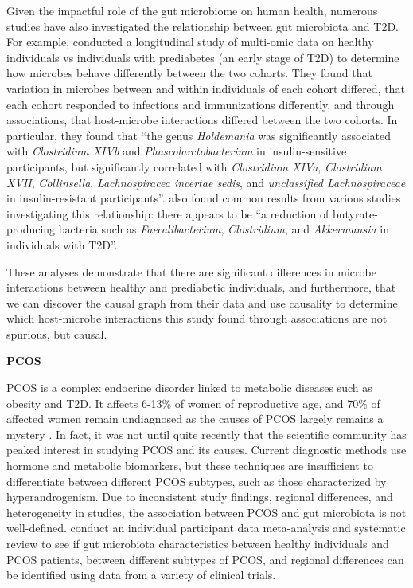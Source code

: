 \documentclass[12pt,letterpaper]{article}
\begin{document}
Given the impactful role of the gut microbiome on human health, numerous studies have also investigated the relationship between gut microbiota and T2D. For example, \citep{zhou2019t2d} conducted a longitudinal study of multi-omic data on healthy individuals vs individuals with prediabetes (an early stage of T2D) to determine how microbes behave differently between the two cohorts. They found that variation in microbes between and within individuals of each cohort differed, that each cohort responded to infections and immunizations differently, and through associations, that host-microbe interactions differed between the two cohorts. In particular, they found that “the genus \textit{Holdemania} was significantly associated with \textit{Clostridium XIVb} and \textit{Phascolarctobacterium} in insulin-sensitive participants, but significantly correlated with \textit{Clostridium XIVa}, \textit{Clostridium XVII}, \textit{Collinsella}, \textit{Lachnospiracea incertae sedis}, and \textit{unclassified Lachnospiraceae} in insulin-resistant participants”. \citep{baars2024gutt2d} also found common results from various studies investigating this relationship: there appears to be “a reduction of butyrate-producing bacteria such as \textit{Faecalibacterium}, \textit{Clostridium}, and \textit{Akkermansia} in individuals with T2D”. 

These analyses demonstrate that there are significant differences in microbe interactions between healthy and prediabetic individuals, and furthermore, that we can discover the causal graph from their data and use causality to determine which host-microbe interactions this study found through associations are not spurious, but causal. \newline

\textbf{PCOS}

PCOS is a complex endocrine disorder linked to metabolic diseases such as obesity and T2D. It affects 6-13\% of women of reproductive age, and 70\% of affected women remain undiagnosed as the causes of PCOS largely remains a mystery \citep{who2025pcos}. In fact, it was not until quite recently that the scientific community has peaked interest in studying PCOS and its causes. Current diagnostic methods use hormone and metabolic biomarkers, but these techniques are insufficient to differentiate between different PCOS subtypes, such as those characterized by hyperandrogenism. Due to inconsistent study findings, regional differences, and heterogeneity in studies, the association between PCOS and gut microbiota is not well-defined. \citep{yang2024pcos} conduct an individual participant data meta-analysis and systematic review to see if gut microbiota characteristics between healthy individuals and PCOS patients, between different subtypes of PCOS, and regional differences can be identified using data from a variety of clinical trials.
\end{document}
